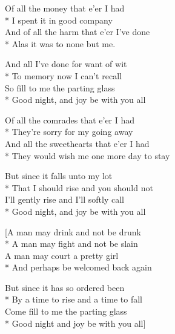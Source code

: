 

\versemark
Of all the money that e’er I had\\*
I spent it in good company\\
And of all the harm that e’er I’ve done\\*
Alas it was to none but me.

And all I’ve done for want of wit\\*
To memory now I can’t recall\\
So fill to me the parting glass\\*
Good night, and joy be with you all

\versemark
Of all the comrades that e’er I had\\*
They’re sorry for my going away\\
And all the sweethearts that e’er I had\\*
They would wish me one more day to stay

But since it falls unto my lot\\*
That I should rise and you should not\\
I’ll gently rise and I’ll softly call\\*
Good night, and joy be with you all

[A man may drink and not be drunk\\*
A man may fight and not be slain\\
A man may court a pretty girl\\*
And perhaps be welcomed back again

But since it has so ordered been\\*
By a time to rise and a time to fall\\
Come fill to me the parting glass\\*
Good night and joy be with you all]

